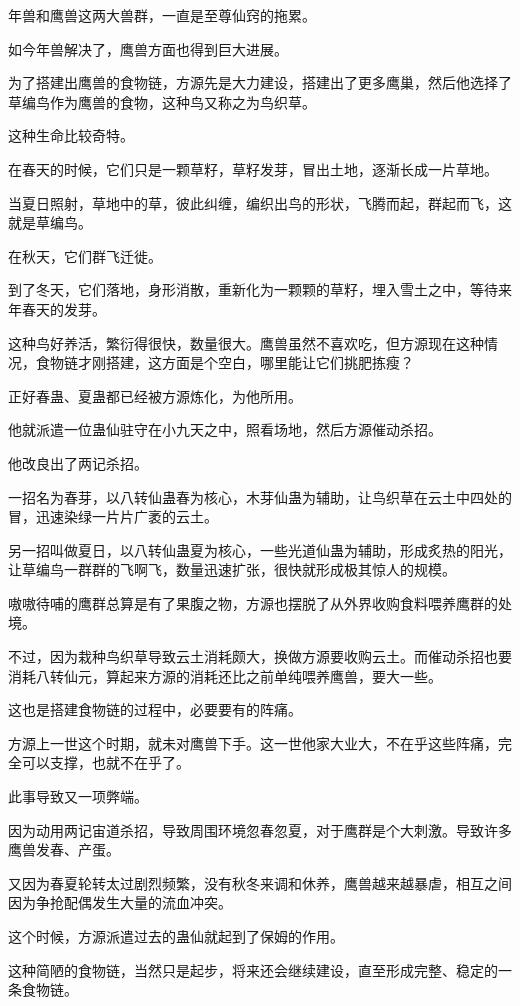 \begin{this_body}
年兽和鹰兽这两大兽群，一直是至尊仙窍的拖累。

如今年兽解决了，鹰兽方面也得到巨大进展。

为了搭建出鹰兽的食物链，方源先是大力建设，搭建出了更多鹰巢，然后他选择了草编鸟作为鹰兽的食物，这种鸟又称之为鸟织草。

这种生命比较奇特。

在春天的时候，它们只是一颗草籽，草籽发芽，冒出土地，逐渐长成一片草地。

当夏日照射，草地中的草，彼此纠缠，编织出鸟的形状，飞腾而起，群起而飞，这就是草编鸟。

在秋天，它们群飞迁徙。

到了冬天，它们落地，身形消散，重新化为一颗颗的草籽，埋入雪土之中，等待来年春天的发芽。

这种鸟好养活，繁衍得很快，数量很大。鹰兽虽然不喜欢吃，但方源现在这种情况，食物链才刚搭建，这方面是个空白，哪里能让它们挑肥拣瘦？

正好春蛊、夏蛊都已经被方源炼化，为他所用。

他就派遣一位蛊仙驻守在小九天之中，照看场地，然后方源催动杀招。

他改良出了两记杀招。

一招名为春芽，以八转仙蛊春为核心，木芽仙蛊为辅助，让鸟织草在云土中四处的冒，迅速染绿一片片广袤的云土。

另一招叫做夏日，以八转仙蛊夏为核心，一些光道仙蛊为辅助，形成炙热的阳光，让草编鸟一群群的飞啊飞，数量迅速扩张，很快就形成极其惊人的规模。

嗷嗷待哺的鹰群总算是有了果腹之物，方源也摆脱了从外界收购食料喂养鹰群的处境。

不过，因为栽种鸟织草导致云土消耗颇大，换做方源要收购云土。而催动杀招也要消耗八转仙元，算起来方源的消耗还比之前单纯喂养鹰兽，要大一些。

这也是搭建食物链的过程中，必要要有的阵痛。

方源上一世这个时期，就未对鹰兽下手。这一世他家大业大，不在乎这些阵痛，完全可以支撑，也就不在乎了。

此事导致又一项弊端。

因为动用两记宙道杀招，导致周围环境忽春忽夏，对于鹰群是个大刺激。导致许多鹰兽发春、产蛋。

又因为春夏轮转太过剧烈频繁，没有秋冬来调和休养，鹰兽越来越暴虐，相互之间因为争抢配偶发生大量的流血冲突。

这个时候，方源派遣过去的蛊仙就起到了保姆的作用。

这种简陋的食物链，当然只是起步，将来还会继续建设，直至形成完整、稳定的一条食物链。


\end{this_body}
